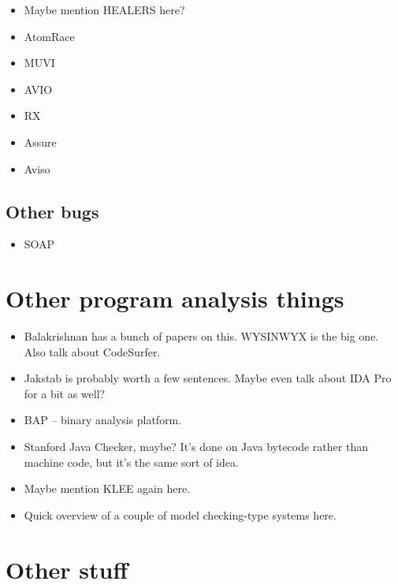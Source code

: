 \begin{itemize}
\item Maybe mention HEALERS here?
\item AtomRace
\item MUVI
\item AVIO
\item RX
\item Assure
\item Aviso
\end{itemize}

\subsection{Other bugs}

\begin{itemize}
\item SOAP
\end{itemize}

\section{Other program analysis things}

\begin{itemize}
\item Balakrishnan has a bunch of papers on this.  WYSINWYX is the big
  one.  Also talk about CodeSurfer.
\item Jakstab is probably worth a few sentences.  Maybe even talk
  about IDA Pro for a bit as well?
\item BAP -- binary analysis platform.
\item Stanford Java Checker, maybe?  It's done on Java bytecode rather
  than machine code, but it's the same sort of idea.
\item Maybe mention KLEE again here.
\item Quick overview of a couple of model checking-type systems here.
\end{itemize}

\section{Other stuff}

